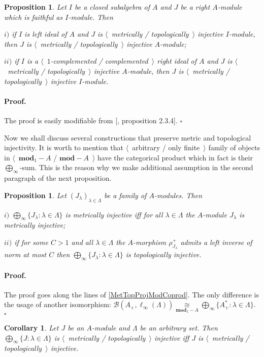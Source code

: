 \documentclass[12pt]{article}
\newcommand{\isom}[1]{\mathop{\mathbin{\cong}}\limits_{#1}}
\newtheorem{proposition}[theorem]{Proposition}
\newtheorem{corollary}[theorem]{Corollary}
\renewenvironment{proof}{\paragraph{Proof.}}{\hfill$\square$\medskip}
\begin{document}
\begin{proposition}\label{MetTopInjUnderChangeOfAlg} Let $I$ be a closed subalgebra of $A$ and $J$ be a right $A$-module which is faithful as $I$-module. Then

$i)$ if $I$ is left ideal of $A$ and $J$ is $\langle$~metrically / topologically~$\rangle$  injective $I$-module, then $J$ is $\langle$~metrically / topologically~$\rangle$ injective $A$-module;

$ii)$ if $I$ is a $\langle$~$1$-complemented  / complemented~$\rangle$ right ideal of $A$ and $J$ is $\langle$~metrically / topologically~$\rangle$ injective $A$-module, then $J$ is $\langle$~metrically / topologically~$\rangle$ injective $I$-module.
\end{proposition}
\begin{proof} The proof is easily modifiable from [\cite{RamsHomPropSemgroupAlg}, proposition 2.3.4].
\end{proof}

Now we shall discuss several constructions that preserve metric and topological injectivity. It is worth to mention that $\langle$~arbitrary / only finite~$\rangle$ family of objects in $\langle$~$\mathbf{mod}_1-A$ / $\mathbf{mod}-A$~$\rangle$ have the categorical product which in fact is their $\bigoplus_\infty$-sum. This is the reason why we make additional assumption in the second paragraph of the next proposition.

\begin{proposition}\label{MetTopInjModProd} Let $(J_\lambda)_{\lambda\in\Lambda}$ be a family of $A$-modules. Then 

$i)$ $\bigoplus_\infty\{J_\lambda:\lambda\in\Lambda\}$ is metrically injective iff for all $\lambda\in\Lambda$ the $A$-module $J_\lambda$ is metrically injective;

$ii)$ if for some $C>1$ and all $\lambda\in\Lambda$ the $A$-morphism $\rho_{J_\lambda}^+$ admits a left inverse of norm at most $C$ then $\bigoplus_\infty\{J_\lambda:\lambda\in\Lambda\}$ is topologically injective.
\end{proposition}
\begin{proof} The proof goes along the lines of \ref{MetTopProjModCoprod}. The only difference is the usage of another isomorphism: $\mathcal{B}(A_+,\ell_\infty(\Lambda))\isom{\mathbf{mod}_1-A}\bigoplus_\infty\{A_+^*:\lambda\in\Lambda\}$.
\end{proof}

\begin{corollary}\label{MetTopInjlInftySum} Let $J$ be an $A$-module and $\Lambda$ be an arbitrary set. Then $\bigoplus_\infty\{J:\lambda\in\Lambda\}$ is $\langle$~metrically / topologically~$\rangle$ injective iff $J$ is $\langle$~metrically / topologically~$\rangle$ injective.
\end{corollary}
\end{document}
